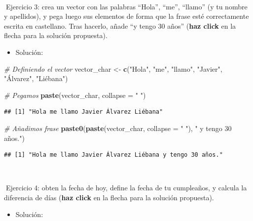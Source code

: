\documentclass[11pt,]{book}
\newenvironment{Shaded}{\begin{snugshade}}{\end{snugshade}}
\newcommand{\CommentTok}[1]{\textcolor[rgb]{0.37,0.37,0.37}{\textit{#1}}}
\newcommand{\DataTypeTok}[1]{\textcolor[rgb]{0.27,0.27,0.27}{#1}}
\newcommand{\KeywordTok}[1]{\textcolor[rgb]{0.27,0.27,0.27}{\textbf{#1}}}
\newcommand{\NormalTok}[1]{#1}
\newcommand{\StringTok}[1]{\textcolor[rgb]{0.5,0.5,0.5}{#1}}
\providecommand{\tightlist}{%
  \setlength{\itemsep}{0pt}\setlength{\parskip}{0pt}}
\begin{document}
~

📝Ejercicio 3: crea un vector con las palabras ``Hola'', ``me'', ``llamo'' (y tu nombre y apellidos), y pega luego sus elementos de forma que la frase esté correctamente escrita en castellano. Tras hacerlo, añade ``y tengo 30 años'' (\textbf{haz click} en la flecha para la solución propuesta).

\begin{itemize}
\tightlist
\item
  Solución:
\end{itemize}

\begin{Shaded}
\begin{Highlighting}[]
\CommentTok{# Definiendo el vector}
\NormalTok{vector_char <-}\StringTok{ }\KeywordTok{c}\NormalTok{(}\StringTok{"Hola"}\NormalTok{, }\StringTok{"me"}\NormalTok{, }\StringTok{"llamo"}\NormalTok{, }\StringTok{"Javier"}\NormalTok{,}
                 \StringTok{"Álvarez"}\NormalTok{, }\StringTok{"Liébana"}\NormalTok{)}

\CommentTok{# Pegamos}
\KeywordTok{paste}\NormalTok{(vector_char, }\DataTypeTok{collapse =} \StringTok{" "}\NormalTok{)}
\end{Highlighting}
\end{Shaded}

\begin{verbatim}
## [1] "Hola me llamo Javier Álvarez Liébana"
\end{verbatim}

\begin{Shaded}
\begin{Highlighting}[]
\CommentTok{# Añadimos frase}
\KeywordTok{paste0}\NormalTok{(}\KeywordTok{paste}\NormalTok{(vector_char, }\DataTypeTok{collapse =} \StringTok{" "}\NormalTok{), }\StringTok{" y tengo 30 años."}\NormalTok{)}
\end{Highlighting}
\end{Shaded}

\begin{verbatim}
## [1] "Hola me llamo Javier Álvarez Liébana y tengo 30 años."
\end{verbatim}

~

📝Ejercicio 4: obten la fecha de hoy, define la fecha de tu cumpleaños, y calcula la diferencia de días (\textbf{haz click} en la flecha para la solución propuesta).

\begin{itemize}
\tightlist
\item
  Solución:
\end{itemize}
\end{document}
